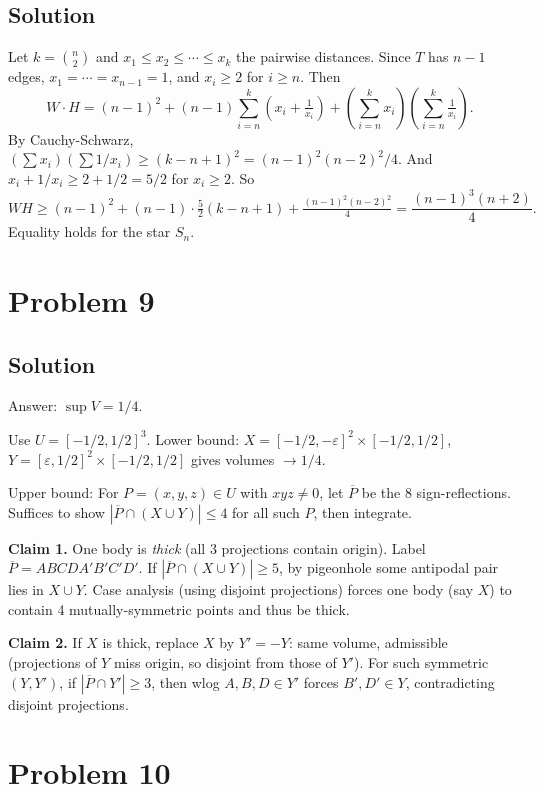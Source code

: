 \documentclass{article}
\begin{document}
\subsection*{Solution}
Let $k = \binom{n}{2}$ and $x_1 \leq x_2 \leq \cdots \leq x_k$ the pairwise distances. Since $T$ has $n-1$ edges, $x_1 = \cdots = x_{n-1} = 1$, and $x_i \geq 2$ for $i \geq n$. Then
\[ W \cdot H = (n-1)^2 + (n-1) \sum_{i=n}^{k}\left(x_i + \tfrac{1}{x_i}\right) + \left(\sum_{i=n}^{k} x_i\right)\left(\sum_{i=n}^{k} \tfrac{1}{x_i}\right). \]
By Cauchy-Schwarz, $\left(\sum x_i\right)\left(\sum 1/x_i\right) \geq (k-n+1)^2 = (n-1)^2(n-2)^2/4$. And $x_i + 1/x_i \geq 2 + 1/2 = 5/2$ for $x_i \geq 2$. So
\[ W H \geq (n-1)^2 + (n-1) \cdot \tfrac{5}{2}(k-n+1) + \tfrac{(n-1)^2(n-2)^2}{4} = \frac{(n-1)^3(n+2)}{4}. \]
Equality holds for the star $S_n$.

\section*{Problem 9}
\subsection*{Solution}
Answer: $\sup V = 1/4$.

Use $U = [-1/2, 1/2]^3$. Lower bound: $X = [-1/2, -\varepsilon]^2 \times [-1/2, 1/2]$, $Y = [\varepsilon, 1/2]^2 \times [-1/2, 1/2]$ gives volumes $\to 1/4$.

Upper bound: For $P = (x,y,z) \in U$ with $xyz \neq 0$, let $\overline{P}$ be the 8 sign-reflections. Suffices to show $|\overline{P} \cap (X \cup Y)| \leq 4$ for all such $P$, then integrate.

\textbf{Claim 1.} One body is \emph{thick} (all 3 projections contain origin). Label $\overline{P} = ABCDA'B'C'D'$. If $|\overline{P} \cap (X \cup Y)| \geq 5$, by pigeonhole some antipodal pair lies in $X \cup Y$. Case analysis (using disjoint projections) forces one body (say $X$) to contain 4 mutually-symmetric points and thus be thick.

\textbf{Claim 2.} If $X$ is thick, replace $X$ by $Y' = -Y$: same volume, admissible (projections of $Y$ miss origin, so disjoint from those of $Y'$). For such symmetric $(Y, Y')$, if $|\overline{P} \cap Y'| \geq 3$, then wlog $A, B, D \in Y'$ forces $B', D' \in Y$, contradicting disjoint projections.

\section*{Problem 10}
\end{document}
